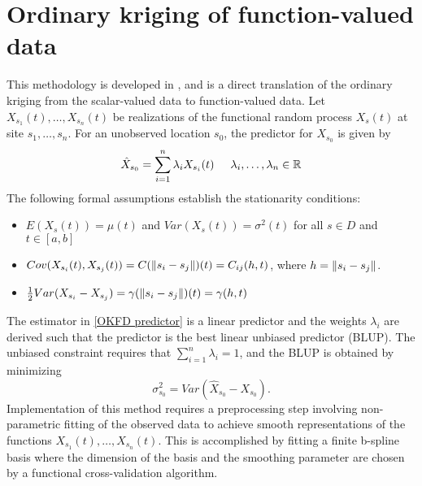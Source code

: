 \section{Ordinary kriging of function-valued data} %
\label{sec:ordinary_kriging_of_function_valued_data}
This methodology is developed in \cite{Giraldo:2010jx}, and is a direct translation of the ordinary kriging from the scalar-valued data to function-valued data. Let $X_{s_1}(t), \dots, X_{s_n}(t)$ be realizations of the functional random process $X_s(t)$ at site $s_1, \dots, s_n$. For an unobserved location $s_0$, the predictor for $X_{s_0}$ is given by 
\begin{equation}
	\hat{X}_{s_0} = \sum_{i=1}^n\lambda_i X_{s_i}(t) \mbox{\hspace{0.5cm}} \lambda_i, \dots, \lambda_n \in \mathbb{R} \label{OKFD predictor}
\end{equation}
The following formal assumptions establish the stationarity conditions:
\begin{itemize}
	\item $E(X_s(t)) = \mu(t)$ and $Var(X_s(t)) = \sigma^2(t)$ for all $s \in D$ and $t \in [a,b]$
	\item $Cov(X_{s_i}(t), X_{s_j}(t)) = C(\left\|s_i - s_j\right\|)(t) = C_{ij}(h,t)$, where $h = \left\|s_i - s_j\right\|$.
	\item $\frac{1}{2}Var(X_{s_i} - X_{s_j}) = \gamma(\left\|s_i - s_j\right\|)(t) = \gamma(h,t)$
\end{itemize}
The estimator in \eqref{OKFD predictor} is a linear predictor and the weights $\lambda_i$ are derived such that the predictor is the best linear unbiased predictor (BLUP). The unbiased constraint requires that $\sum_{i=1}^n\lambda_i = 1$, and the BLUP is obtained by minimizing
\begin{equation}
	\sigma^2_{s_0} = Var(\hat{X}_{s_0} - X_{s_0}).
\end{equation}
Implementation of this method requires a preprocessing step involving non-parametric fitting of the observed data to achieve smooth representations of the functions $X_{s_1}(t), \dots, X_{s_n}(t)$. This is accomplished by fitting a finite b-spline basis where the dimension of the basis and the smoothing parameter are chosen by a functional cross-validation algorithm. 

